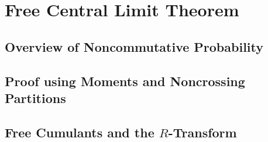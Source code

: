 \documentclass[10pt]{mypackage}
\begin{document}
\section{Free Central Limit Theorem}%
\subsection{Overview of Noncommutative Probability}%
\subsection{Proof using Moments and Noncrossing Partitions}%
\subsection{Free Cumulants and the $R$-Transform}%
\nocite{billingsley_probability_and_measure,lectures_combinatorics_free_probability}
\printbibliography
\end{document}
